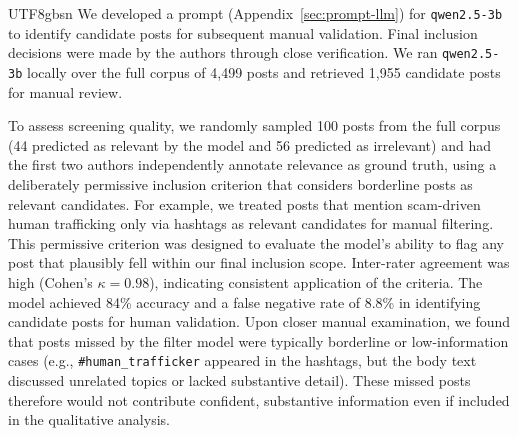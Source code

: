 \documentclass[sigconf,nonacm]{acmart}
\newcommand{\add}[1]{#1}
\newcommand{\minor}[1]{#1}
\begin{document}
\begin{CJK}{UTF8}{gbsn}
\minor{We developed a prompt (Appendix~\ref{sec:prompt-llm}) for \texttt{qwen2.5-3b} to identify candidate posts for subsequent manual validation. Final inclusion decisions were made by the authors through close verification. We ran \texttt{qwen2.5-3b} locally over the full corpus of 4,499 posts and retrieved 1,955 candidate posts for manual review.}

\minor{To assess screening quality, we randomly sampled 100 posts from the full corpus (44 predicted as relevant by the model and 56 predicted as irrelevant) and had the first two authors independently annotate relevance as ground truth, using a deliberately permissive inclusion criterion that considers borderline posts as relevant candidates. For example, we treated posts that mention scam-driven human trafficking only via hashtags as relevant candidates for manual filtering. This permissive criterion was designed to evaluate the model's ability to flag any post that plausibly fell within our final inclusion scope. Inter-rater agreement was high (Cohen's $\kappa = 0.98$), indicating consistent application of the criteria. The model achieved 84\% accuracy and a false negative rate of 8.8\% in identifying candidate posts for human validation. Upon closer manual examination, we found that posts missed by the filter model were typically borderline or low-information cases (e.g., \texttt{\#human\_trafficker} appeared in the hashtags, but the body text discussed unrelated topics or lacked substantive detail). These missed posts therefore would not contribute confident, substantive information even if included in the qualitative analysis.}



\end{CJK}
\end{document}
